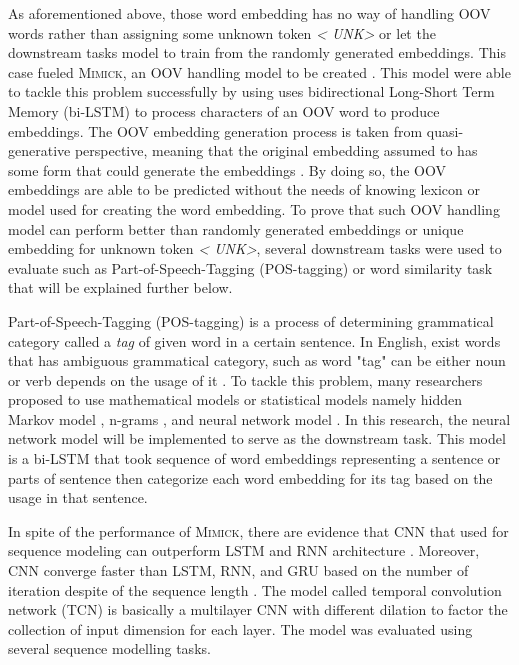 As aforementioned above, those word embedding has no way of handling
OOV words rather than assigning some unknown token \textit{\textless
UNK\textgreater} or let the downstream tasks model to train from the
randomly generated embeddings. This case fueled \textsc{Mimick}, an
OOV handling model to be created \citep{mimicking2017Pinter}. This
model were able to tackle this problem successfully by using uses
bidirectional Long-Short Term Memory (bi-LSTM) to process characters
of an OOV word to produce embeddings. The OOV embedding generation
process is taken from quasi-generative perspective, meaning that the
original embedding assumed to has some form that could generate the
embeddings \citep{mimicking2017Pinter}. By doing so, the OOV
embeddings are able to be predicted without the needs of knowing
lexicon or model used for creating the word embedding. To prove that
such OOV handling model can perform better than randomly generated
embeddings or unique embedding for unknown token \textit{\textless
UNK\textgreater}, several downstream tasks were used to evaluate such
as Part-of-Speech-Tagging (POS-tagging) or word similarity task that
will be explained further below.

Part-of-Speech-Tagging (POS-tagging) is a process of determining
grammatical category called a \textit{tag} of given word in a certain
sentence. In English, exist words that has ambiguous grammatical
category, such as word "tag" can be either noun or verb depends on the
usage of it \citep{apractical1992cutting}. To tackle this problem,
many researchers proposed to use mathematical models or statistical
models namely hidden Markov model \citep{apractical1992cutting},
n-grams \citep{tnt2000Brants}, and neural network model
\citep{finding2015ling}. In this research, the neural network model
will be implemented to serve as the downstream task. This model is a
bi-LSTM that took sequence of word embeddings representing a sentence
or parts of sentence then categorize each word embedding for its tag
based on the usage in that sentence.

In spite of the performance of \textsc{Mimick}, there are evidence
that CNN that used for sequence modeling can outperform LSTM and RNN
architecture \citep{empirical2018shaujie}. Moreover, CNN converge
faster than LSTM, RNN, and GRU based on the number of iteration
despite of the sequence length \citep{empirical2018shaujie}. The model
called temporal convolution network (TCN) is basically a multilayer
CNN with different dilation to factor the collection of input
dimension for each layer. The model was evaluated using several
sequence modelling tasks.


